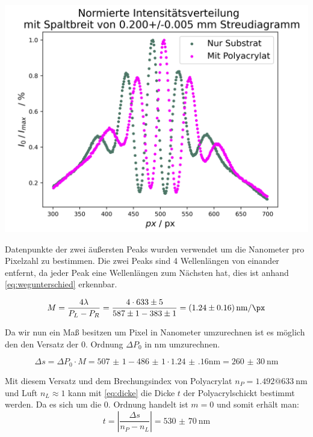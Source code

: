 \documentclass[11pt,ngerman]{scrartcl}
\begin{document}
\begin{center}
	\begin{minipage}[t]{0.7\textwidth}
		\includegraphics[width=\textwidth]{auswertung/sprung}
		\label{fig:sprung}
	\end{minipage}
\end{center}

\noindent Datenpunkte der zwei äußersten Peaks wurden verwendet um die Nanometer pro
Pixelzahl zu bestimmen. Die zwei Peaks sind 4 Wellenlängen von einander
entfernt, da jeder Peak eine Wellenlängen zum Nächsten hat, dies ist anhand
\autoref{eq:wegunterschied} erkennbar.

\begin{equation}
	M = \frac{4\lambda}{P_L-P_R} = \frac{4 \cdot \num{633(5)}}{\num{587(1)}-\num{383(1)}} = \SI{1.24(16)}{\nm\per\px}
	\label{eq:nmperpx}
\end{equation}


\noindent Da wir nun ein Maß besitzen um Pixel in Nanometer umzurechnen ist es möglich den
den Versatz der 0. Ordnung $\Delta P_0$ in \si{\nm} umzurechnen.

\begin{equation}
	\Delta s = \Delta P_0 \cdot M = \num{507(1)}-\num{486(1)} \cdot \num{1.24(16)} \si{\nm} = \SI{260(30)}{\nm}
	\label{eq:peakversatz}
\end{equation}

\noindent Mit diesem Versatz und dem Brechungsindex von Polyacrylat $n_P = 1.492 @
	\SI{633}{\nm}$ \cite{vorlageinterfero} und Luft $n_L \approx 1$ kann mit
\autoref{eq:dicke} die Dicke $t$ der Polyacrylschickt bestimmt werden. Da es
sich um die 0. Ordnung handelt ist $m=0$ und somit erhält man:
\begin{equation}
	t = |\frac{\Delta s}{n_P-n_L}| = \SI{530(70)}{\nm}
	\label{eq:dickederschicht}
\end{equation}
\end{document}
